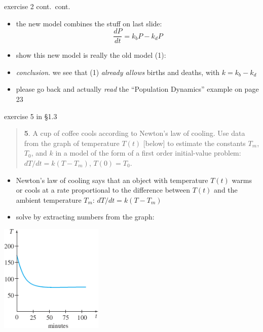 \documentclass{beamer}
\begin{document}
\begin{frame}{exercise 2 cont.~cont.}

\begin{itemize}
\item the new model combines the stuff on last slide:
    $$\frac{dP}{dt} = k_b P - k_d P$$
\item show this new model is really the old model (1):
\vspace{20mm}

\bigskip
\item \emph{conclusion}.  we see that (1) \emph{already allows} births and deaths, with $k=k_b-k_d$

\bigskip
\item \alert{please go back and actually \emph{read} the ``Population Dynamics'' example on page 23}
\end{itemize}
\end{frame}


\begin{frame}{exercise 5 in \S 1.3}

\scriptsize
\begin{quotation}
\noindent \textbf{5}.  A cup of coffee cools according to Newton's law of cooling.  Use data from the graph of temperature $T(t)$ [below] to estimate the constants $T_m$, $T_0$, and $k$ in a model of the form of a first order initial-value problem: $dT/dt = k(T-T_m)$, $T(0)=T_0$.
\end{quotation}

\vspace{-4mm}

\small
\begin{itemize}
\item Newton's law of cooling says that an object with temperature $T(t)$ warms or cools at a rate proportional to the difference between $T(t)$ and the ambient temperature $T_m$: \quad $dT/dt = k(T-T_m)$
\item solve by extracting numbers from the graph:
\end{itemize}

\vspace{-1mm}

\includegraphics[width=0.37\textwidth]{figs/exercise-5-1-3}
\end{frame}
\end{document}
